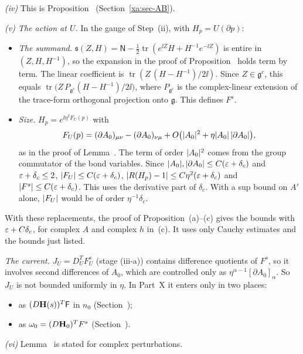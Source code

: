 \begin{detail}\label{xa:d-step-v}
\emph{(iv)} This is Proposition~ (Section~\ref{xa:sec-AB}).

\emph{(v) The action at $U$.} In the gauge of Step~(ii), with $H_p=U(\partial p)$:
\begin{itemize}
\item \emph{The summand.} $\mathfrak s(Z,H)=\mathsf N-\frac12\operatorname{tr}(e^{\ii Z}H+H^{-1}e^{-\ii Z})$ is entire in $(Z,H,H^{-1})$, so the expansion in the proof of Proposition~ holds term by term. The linear coefficient is $\operatorname{tr}(Z\,(H-H^{-1})/2\ii)$. Since $Z\in\mathfrak g^c$, this equals $\operatorname{tr}\big(Z\,P_{\mathfrak g^c}(H-H^{-1})/2\ii\big)$, where $P_{\mathfrak g^c}$ is the complex-linear extension of the trace-form orthogonal projection onto $\mathfrak g$. This defines $F^s$.
\item \emph{Size.} $H_p=e^{\ii\eta^2F_U(p)}$ with
\[
F_U(p)=(\partial A_0)_{\mu\nu}-(\partial A_0)_{\nu\mu}+O\big(\lvert A_0\rvert^2+\eta\lvert A_0\rvert\,\lvert\partial A_0\rvert\big),
\]
as in the proof of Lemma~. The term of order $\lvert A_0\rvert^2$ comes from the group commutator of the bond variables. Since $\lvert A_0\rvert,\lvert\partial A_0\rvert\le C(\varepsilon+\delta_c)$ and $\varepsilon+\delta_c\le2$, $\lvert F_U\rvert\le C(\varepsilon+\delta_c)$, $\lvert R(H_p)-1\rvert\le C\eta^2(\varepsilon+\delta_c)$ and $\lvert F^s\rvert\le C(\varepsilon+\delta_c)$. This uses the derivative part of $\delta_c$. With a sup bound on $A'$ alone, $\lvert F_U\rvert$ would be of order $\eta^{-1}\delta_c$.
\end{itemize}
With these replacements, the proof of Proposition~(a)--(c) gives the bounds with $\varepsilon+C\delta_c$, for complex $A$ and complex $h$ in~(c). It uses only Cauchy estimates and the bounds just listed.

\emph{The current.} $J_U=D_U^TF^s_U$ (stage (iii-a)) contains difference quotients of $F^s$, so it involves second differences of $A_0$, which are controlled only as $\eta^{\alpha-1}[\partial A_0]_\alpha$. So $J_U$ is not bounded uniformly in $\eta$. In Part~X it enters only in two places:
\begin{itemize}
\item as $(D\mathbf H(s))^T\mathsf F$ in $n_0$ (Section~);
\item as $\omega_0=(D\mathbf H_0)^TF^s$ (Section~).
\end{itemize}

\emph{(vi)} Lemma~ is stated for complex perturbations.
\end{detail}

